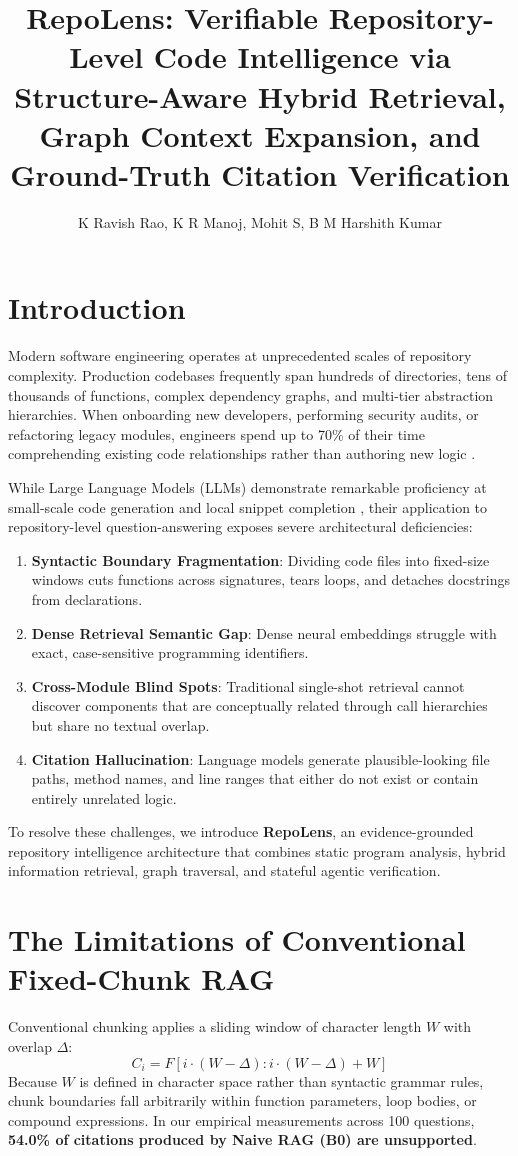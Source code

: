\documentclass[sigconf,screen]{acmart}
\title{RepoLens: Verifiable Repository-Level Code Intelligence via Structure-Aware Hybrid Retrieval, Graph Context Expansion, and Ground-Truth Citation Verification}
\author{K Ravish Rao, K R Manoj, Mohit S, B M Harshith Kumar}
\affiliation{%
  \institution{Department of Computer Science and Engineering, PES University}
  \city{Bangalore}
  \country{India}
}
\begin{document}
\maketitle

\section{Introduction}
Modern software engineering operates at unprecedented scales of repository complexity. Production codebases frequently span hundreds of directories, tens of thousands of functions, complex dependency graphs, and multi-tier abstraction hierarchies. When onboarding new developers, performing security audits, or refactoring legacy modules, engineers spend up to 70\% of their time comprehending existing code relationships rather than authoring new logic \cite{latoza2006, xia2017}.

While Large Language Models (LLMs) demonstrate remarkable proficiency at small-scale code generation and local snippet completion \cite{chen2021, fried2022}, their application to repository-level question-answering exposes severe architectural deficiencies:
\begin{enumerate}
    \item \textbf{Syntactic Boundary Fragmentation}: Dividing code files into fixed-size windows cuts functions across signatures, tears loops, and detaches docstrings from declarations.
    \item \textbf{Dense Retrieval Semantic Gap}: Dense neural embeddings struggle with exact, case-sensitive programming identifiers.
    \item \textbf{Cross-Module Blind Spots}: Traditional single-shot retrieval cannot discover components that are conceptually related through call hierarchies but share no textual overlap.
    \item \textbf{Citation Hallucination}: Language models generate plausible-looking file paths, method names, and line ranges that either do not exist or contain entirely unrelated logic.
\end{enumerate}

To resolve these challenges, we introduce \textbf{RepoLens}, an evidence-grounded repository intelligence architecture that combines static program analysis, hybrid information retrieval, graph traversal, and stateful agentic verification.

\section{The Limitations of Conventional Fixed-Chunk RAG}
Conventional chunking applies a sliding window of character length $W$ with overlap $\Delta$:
\begin{equation}
C_i = F[i \cdot (W - \Delta) : i \cdot (W - \Delta) + W]
\end{equation}
Because $W$ is defined in character space rather than syntactic grammar rules, chunk boundaries fall arbitrarily within function parameters, loop bodies, or compound expressions. In our empirical measurements across 100 questions, \textbf{54.0\% of citations produced by Naive RAG (B0) are unsupported}.
\end{document}
